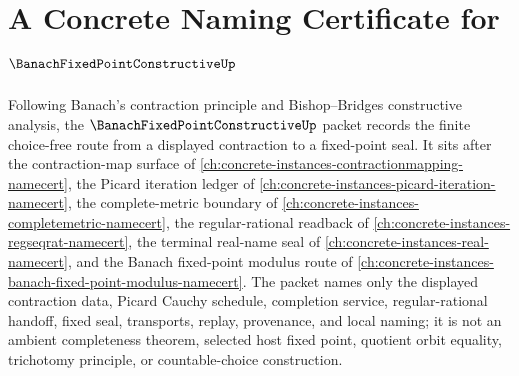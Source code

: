 \chapter{A Concrete Naming Certificate for $\BanachFixedPointConstructiveUp$}
\label{ch:concrete-instances-banach-fixed-point-constructive-namecert}

Following Banach's contraction principle and Bishop--Bridges constructive analysis, the $\BanachFixedPointConstructiveUp$ packet records the finite choice-free route from a displayed contraction to a fixed-point seal. It sits after the contraction-map surface of \autoref{ch:concrete-instances-contractionmapping-namecert}, the Picard iteration ledger of \autoref{ch:concrete-instances-picard-iteration-namecert}, the complete-metric boundary of \autoref{ch:concrete-instances-completemetric-namecert}, the regular-rational readback of \autoref{ch:concrete-instances-regseqrat-namecert}, the terminal real-name seal of \autoref{ch:concrete-instances-real-namecert}, and the Banach fixed-point modulus route of \autoref{ch:concrete-instances-banach-fixed-point-modulus-namecert}. The packet names only the displayed contraction data, Picard Cauchy schedule, completion service, regular-rational handoff, fixed seal, transports, replay, provenance, and local naming; it is not an ambient completeness theorem, selected host fixed point, quotient orbit equality, trichotomy principle, or countable-choice construction.

